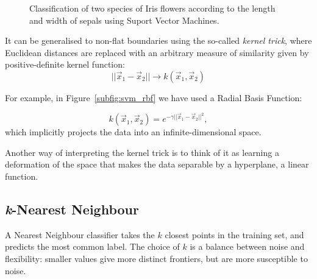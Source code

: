 \begin{figure}
\centering
{}%
\hfill
{}%
\caption{Classification of two species of Iris flowers according to the length and width of sepals using Suport Vector Machines.}\label{fig:svm}
\end{figure}

It can be generalised  to non-flat boundaries using the so-called \emph{kernel trick}, where Euclidean distances are replaced with an arbitrary measure of similarity given by positive-definite kernel function:
\[||\vec{x}_1 - \vec{x}_2|| \rightarrow k(\vec{x}_1, \vec{x}_2)\]

For example, in Figure~\ref{subfig:svm_rbf} we have used a Radial Basis Function:

\[k(\vec{x}_1, \vec{x}_2) = e^{-\gamma ||\vec{x}_1 - \vec{x}_2||^2 },\]
which implicitly projects the data into an infinite-dimensional space.

Another way of interpreting the kernel trick is to think of it as learning a deformation of the space that makes the data separable by a hyperplane, a linear function.

\subsection{\emph{k}-Nearest Neighbour}
A Nearest Neighbour classifier takes the $k$ closest points in the training set, and predicts the most common label.
The choice of $k$ is a balance between noise and flexibility: smaller values give more distinct frontiers, but are more susceptible to noise.

